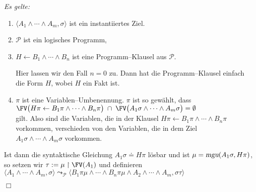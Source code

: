 \begin{Definition}
{\em 
 Es gelte:
\begin{enumerate}
\item $\langle A_1 \wedge \cdots \wedge A_m, \sigma \rangle$ ist ein instantiiertes Ziel.
\item $\mathcal{P}$ ist ein logisches Programm,
\item $H \leftarrow B_1 \wedge \cdots \wedge B_n$ ist eine Programm--Klausel aus $\mathcal{P}$.

      Hier lassen wir den Fall $n=0$ zu.  Dann hat die Programm--Klausel einfach die Form $H$, wobei $H$ ein Fakt ist.
\item $\pi$ ist eine Variablen--Umbenennung. $\pi$ ist so gew\"{a}hlt, dass \\[0.1cm]
      \hspace*{1.3cm} $\FV\big(H\pi \leftarrow B_1\pi \wedge \cdots \wedge B_n\pi\big) \;\cap\; \FV\big(A_1\sigma \wedge \cdots \wedge A_m\sigma \big) = \emptyset$ \\[0.1cm]
      gilt. Also sind die Variablen, die in der Klausel
      $H\pi \leftarrow B_1\pi \wedge \cdots \wedge B_n\pi$ vorkommen, verschieden von den
      Variablen, die in dem Ziel \\
      $A_1\sigma \wedge \cdots \wedge A_m\sigma$ vorkommen.
\end{enumerate}
Ist dann die syntaktische Gleichung $A_1\sigma \doteq H\pi$ l\"{o}sbar und ist $\mu = \textsl{mgu}(A_1\sigma, H\pi)$, so setzen wir $\tau := \mu \restriction \FV(A_1)$
und definieren \\[0.1cm]
\hspace*{1.3cm} 
$\big\langle A_1 \wedge \cdots \wedge A_m, \sigma \big\rangle \leadsto_\mathcal{P} \big\langle B_1\pi\mu \wedge \cdots \wedge B_n\pi\mu \wedge A_2 \wedge \cdots \wedge A_m, \sigma\tau \big\rangle$ 
} \hspace*{\fill} $\Box$
\end{Definition}

